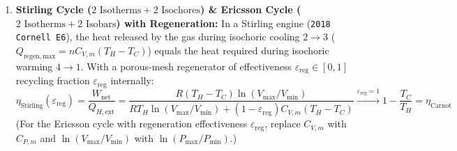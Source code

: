 \begin{formulacard}
\begin{enumerate}
\begin{equation}
  \end{equation}
  Notice that at maximum net work, the Brayton efficiency equals the Curzon--Ahlborn efficiency $\eta_{\mathrm{Brayton}}(r_{p,\mathrm{opt}}) = 1 - \sqrt{T_{\min}/T_{\max}}$!
  \item \textbf{Stirling Cycle ($2\text{ Isotherms} + 2\text{ Isochores}$) \& Ericsson Cycle ($2\text{ Isotherms} + 2\text{ Isobars}$) with Regeneration:}
  In a Stirling engine (\texttt{2018 Cornell E6}), the heat released by the gas during isochoric cooling $2\to 3$ ($Q_{\mathrm{regen,max}} = nC_{V,m}(T_H - T_C)$) equals the heat required during isochoric warming $4\to 1$. With a porous-mesh regenerator of effectiveness $\varepsilon_{\mathrm{reg}} \in [0, 1]$ recycling fraction $\varepsilon_{\mathrm{reg}}$ internally:
  \begin{equation}\label{eq:09:stirling}
    \boxed{\eta_{\mathrm{Stirling}}(\varepsilon_{\mathrm{reg}}) = \frac{W_{\mathrm{net}}}{Q_{H,\mathrm{ext}}} = \frac{R(T_H - T_C)\ln(V_{\max}/V_{\min})}{R T_H\ln(V_{\max}/V_{\min}) + (1 - \varepsilon_{\mathrm{reg}})C_{V,m}(T_H - T_C)}} \xrightarrow{\varepsilon_{\mathrm{reg}} = 1} \boxed{1 - \frac{T_C}{T_H} = \eta_{\mathrm{Carnot}}}
  \end{equation}
  (For the Ericsson cycle with regeneration effectiveness $\varepsilon_{\mathrm{reg}}$, replace $C_{V,m}$ with $C_{P,m}$ and $\ln(V_{\max}/V_{\min})$ with $\ln(P_{\max}/P_{\min})$.)
\end{enumerate}
\end{formulacard}

